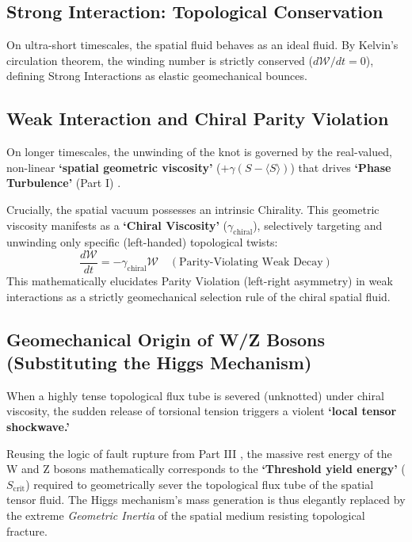 \documentclass[reprint,amsmath,amssymb,aps,prd]{revtex4-2}
\begin{document}
\subsection{Strong Interaction: Topological Conservation}
On ultra-short timescales, the spatial fluid behaves as an ideal fluid. By Kelvin's circulation theorem, the winding number is strictly conserved ($d\mathcal{W}/dt = 0$), defining Strong Interactions as elastic geomechanical bounces.

\subsection{Weak Interaction and Chiral Parity Violation}
On longer timescales, the unwinding of the knot is governed by the real-valued, non-linear \textbf{`spatial geometric viscosity'} ($+\gamma(S - \langle S \rangle)$) that drives \textbf{`Phase Turbulence'} (Part I) \cite{YooPart1}.

Crucially, the spatial vacuum possesses an intrinsic Chirality. This geometric viscosity manifests as a \textbf{`Chiral Viscosity'} ($\gamma_{\mathrm{chiral}}$), selectively targeting and unwinding only specific (left-handed) topological twists:
\begin{equation}
\frac{d\mathcal{W}}{dt} = -\gamma_{\mathrm{chiral}} \mathcal{W} \quad (\text{Parity-Violating Weak Decay})
\end{equation}
This mathematically elucidates Parity Violation (left-right asymmetry) in weak interactions \cite{Wu1957} as a strictly geomechanical selection rule of the chiral spatial fluid.

\subsection{Geomechanical Origin of W/Z Bosons (Substituting the Higgs Mechanism)}
When a highly tense topological flux tube is severed (unknotted) under chiral viscosity, the sudden release of torsional tension triggers a violent \textbf{`local tensor shockwave.'}

Reusing the logic of fault rupture from Part III \cite{YooPart3}, the massive rest energy of the W and Z bosons mathematically corresponds to the \textbf{`Threshold yield energy'} ($S_{\mathrm{crit}}$) required to geometrically sever the topological flux tube of the spatial tensor fluid. The Higgs mechanism's mass generation \cite{Higgs1964} is thus elegantly replaced by the extreme \textit{Geometric Inertia} of the spatial medium resisting topological fracture.
\end{document}
